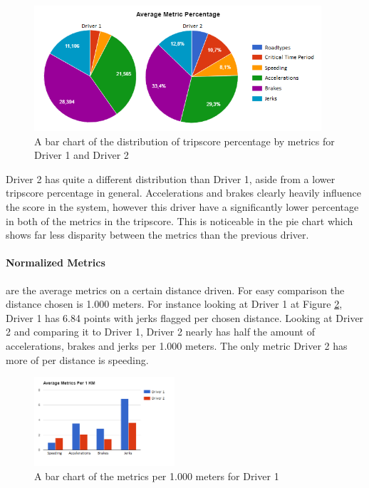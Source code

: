 \begin{figure}[tb]
\centering
\includegraphics[width=0.95\textwidth]{Pictures/piecharts}
\caption{A bar chart of the distribution of tripscore percentage by metrics for Driver 1 and Driver 2}
\label{fig:piecharts}
\end{figure}

Driver 2 has quite a different distribution than Driver 1, aside from a lower tripscore percentage in general. Accelerations and brakes clearly heavily influence the score in the system, however this driver have a significantly lower percentage in both of the metrics in the tripscore. This is noticeable in the pie chart which shows far less disparity between the metrics than the previous driver. 

\paragraph{Normalized Metrics} are the average metrics on a certain distance driven. For easy comparison the distance chosen is 1.000 meters. For instance looking at Driver 1 at Figure \ref{fig:avgmetricnorm}, Driver 1 has 6.84 points with jerks flagged per chosen distance. Looking at Driver 2 and comparing it to Driver 1, Driver 2 nearly has half the amount of accelerations, brakes and jerks per 1.000 meters. The only metric Driver 2 has more of per distance is speeding.

\begin{figure}[tb]
\centering
\includegraphics[width=0.465\textwidth]{Pictures/AverageMetricsNorm}
\caption{A bar chart of the metrics per 1.000 meters for Driver 1}
\label{fig:avgmetricnorm}
\end{figure}

